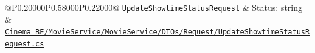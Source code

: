 \begin{landscape}
\begin{longtable}{@{}P{0.20000\SRSWidth}P{0.58000\SRSWidth}P{0.22000\SRSWidth}@{}}
\texttt{Update\allowbreak{}Showtime\allowbreak{}Status\allowbreak{}Request} & Status: string & \href{../../../Cinema\_BE/MovieService/MovieService/DTOs/Request/UpdateShowtimeStatusRequest.cs}{\texttt{Cinema\_\allowbreak{}BE/\allowbreak{}Movie\allowbreak{}Service/\allowbreak{}Movie\allowbreak{}Service/\allowbreak{}DTOs/\allowbreak{}Request/\allowbreak{}Update\allowbreak{}Showtime\allowbreak{}Status\allowbreak{}Request.\allowbreak{}cs}} \\[3pt]
\end{longtable}
\endgroup

\end{landscape}